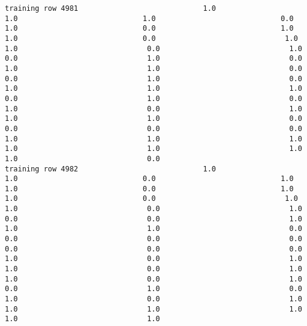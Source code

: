 \documentclass[11pt]{article}
\begin{document}
\begin{verbatim}
training row 4981                             1.0                             1.0                             1.0                             0.0                             1.0                             0.0                             1.0                             1.0                             0.0                              1.0                              1.0                              0.0                              1.0                              0.0                              1.0                              0.0                              1.0                              1.0                              0.0                              0.0                              1.0                              0.0                              1.0                              1.0                              1.0                              0.0                              1.0                              0.0                              1.0                              0.0                              1.0                              1.0                              1.0                              0.0                              0.0                              0.0                              0.0                              1.0                              1.0                              1.0                              1.0                              1.0                              1.0                              1.0                              0.0
training row 4982                             1.0                             1.0                             0.0                             1.0                             1.0                             0.0                             1.0                             1.0                             0.0                              1.0                              1.0                              0.0                              1.0                              0.0                              0.0                              1.0                              1.0                              1.0                              0.0                              0.0                              0.0                              0.0                              0.0                              0.0                              0.0                              1.0                              0.0                              1.0                              1.0                              0.0                              1.0                              1.0                              0.0                              1.0                              0.0                              1.0                              0.0                              1.0                              0.0                              1.0                              1.0                              1.0                              1.0                              1.0                              1.0

\end{verbatim}
\end{document}
